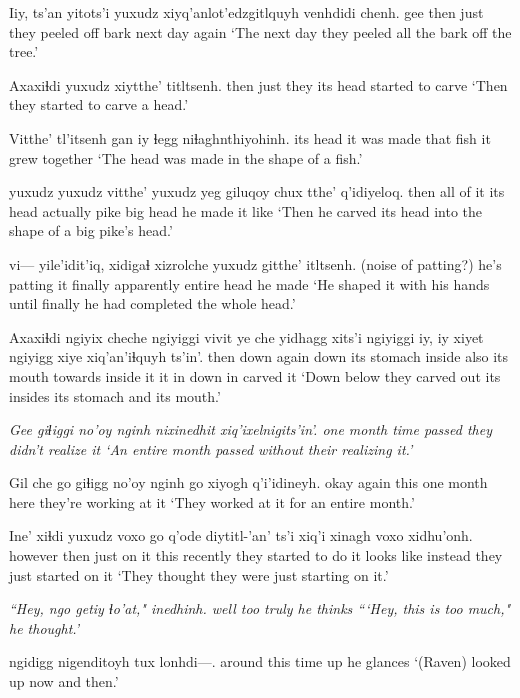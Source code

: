 \documentclass[12pt]{article}
\begin{document}
\gll Iiy, {ts'an yitots'i} yuxudz xiyq'anlot'edzgitlquyh venhdidi chenh.
gee then just {they peeled off bark} {next day} again
\glt `The next day they peeled all the bark off the tree.' 
\glend

\gll Axaxiɬdi yuxudz xiytthe' titltsenh.
then just {they its head} {started to carve}
\glt `Then they started to carve a head.' 
\glend

\gll Vitthe' tl'itsenh {gan iy} ɬegg niɬaghnthiyohinh. 
{its head} {it was made} {that} fish {it grew together}
\glt `The head was made in the shape of a fish.'
\glend

 {yuxudz yuxudz} vitthe' {yuxudz yeg} giluqoy chux tthe' q'idiyeloq. 
then  {all of it} {its head} actually pike big head {he made it like}
\glt `Then he carved its head into the shape of a big pike's head.'
\glend

 vi--- yile'idit'iq, xidigaɬ xizrolche yuxudz gitthe' itltsenh. 
{(noise of patting?)} {} {he's patting it} finally apparently entire head {he made}
\glt `He shaped it with his hands until finally he had completed the whole head.'
\glend

\gll Axaxiɬdi ngiyix cheche ngiyiggi vivit ye che yidhagg xits'i ngiyiggi iy, iy xiyet ngiyigg xiye xiq'an'iɬquyh ts'in'.
then down again down {its stomach} inside also {its mouth} towards inside it it in down in {carved it} {}
\glt `Down below they carved out its insides its stomach and its mouth.' 
\glend

\gll \em Gee giɬiggi {no'oy nginh} nixinedhit {xiq'ixelnigits'in'.}
{} one month {time passed} {they didn't realize it}
\glt `An entire month passed without their realizing it.'
\glend

\gll Gil che go giɬigg {no'oy nginh} go {xiyogh q'i'idineyh.}
okay again this one month here {they're working at it}
\glt `They worked at it for an entire month.' 
\glend

\gll Ine' xiɬdi yuxudz voxo go q'ode diytitl-'an' ts'i xiq'i xinagh {voxo xidhu'onh.} 
however then just {on it} this recently {they started to do it} {} {looks like} instead {they just started on it}
\glt `They thought they were just starting on it.' 
\glend

\gll \em ``Hey, ngo getiy ɬo'at," inedhinh.
{} well too truly {he thinks}
\glt ```Hey, this is too much," he thought.'
\glend

 ngidigg nigenditoyh {tux lonhdi---}. 
{around this time} up {he glances} 
\glt `(Raven) looked up now and then.'
\glend
\end{document}
